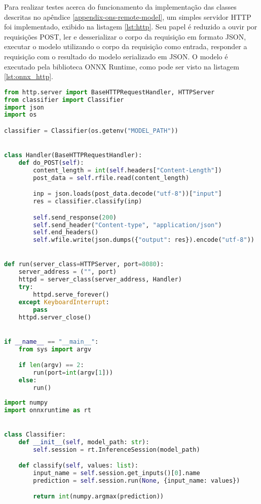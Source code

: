 Para realizar testes acerca do funcionamento da implementação das classes descritas no apêndice \ref{appendix-ons-remote-model}, um simples servidor HTTP foi implementado, exibido na listagem \ref{lst:http}. Seu papel é reduzido a ouvir por requisições POST, ler e desserializar o corpo da requisição em formato JSON, executar o modelo utilizando o corpo da requisição como entrada, responder a requisição com o resultado do modelo serializado em JSON. O modelo é executado pela biblioteca ONNX Runtime, como pode ser visto na listagem \ref{lst:onnx_http}.

\begin{lstlisting}[language=python, caption=Simples servidor HTTP para testes de integração, label={lst:http}]
from http.server import BaseHTTPRequestHandler, HTTPServer
from classifier import Classifier
import json
import os

classifier = Classifier(os.getenv("MODEL_PATH"))


class Handler(BaseHTTPRequestHandler):
    def do_POST(self):
        content_length = int(self.headers["Content-Length"])
        post_data = self.rfile.read(content_length)

        inp = json.loads(post_data.decode("utf-8"))["input"]
        res = classifier.classify(inp)

        self.send_response(200)
        self.send_header("Content-type", "application/json")
        self.end_headers()
        self.wfile.write(json.dumps({"output": res}).encode("utf-8"))


def run(server_class=HTTPServer, port=8080):
    server_address = ("", port)
    httpd = server_class(server_address, Handler)
    try:
        httpd.serve_forever()
    except KeyboardInterrupt:
        pass
    httpd.server_close()


if __name__ == "__main__":
    from sys import argv

    if len(argv) == 2:
        run(port=int(argv[1]))
    else:
        run()
\end{lstlisting}


\begin{lstlisting}[language=python, caption=Classificador usado nas medições e pelo servidor HTTP, label={lst:onnx_http}]
import numpy
import onnxruntime as rt


class Classifier:
    def __init__(self, model_path: str):
        self.session = rt.InferenceSession(model_path)

    def classify(self, values: list):
        input_name = self.session.get_inputs()[0].name
        prediction = self.session.run(None, {input_name: values})

        return int(numpy.argmax(prediction))
\end{lstlisting}